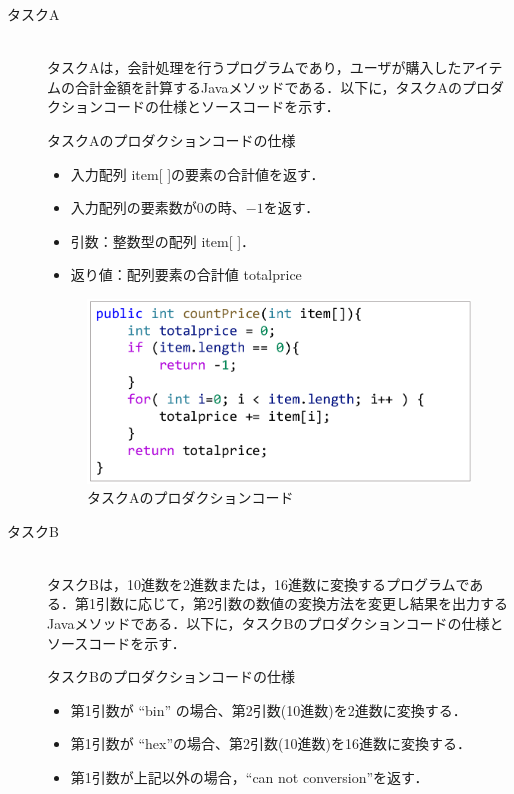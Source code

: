 \documentclass[12pt]{jarticle} %
\begin{document}
\begin{description}
\item[タスクA]~\\
タスクAは，会計処理を行うプログラムであり，ユーザが購入したアイテムの合計金額を計算するJavaメソッドである．以下に，タスクAのプロダクションコードの仕様とソースコードを示す．
\begin{itembox}[l]{タスクAのプロダクションコードの仕様}
\begin{itemize}
\item 入力配列 item[ ]の要素の合計値を返す．
\item 入力配列の要素数が0の時、$-1$を返す．
\item 引数：整数型の配列 item[ ]．
\item 返り値：配列要素の合計値 totalprice
\end{itemize}
\end{itembox}

\begin{figure}[htbp]
  \begin{center}
    \includegraphics[clip,width=12cm]{taskA.pdf}
    \caption{タスクAのプロダクションコード}
    \label{E1}
  \end{center}
\end{figure}

\item[タスクB]~\\
タスクBは，10進数を2進数または，16進数に変換するプログラムである．第1引数に応じて，第2引数の数値の変換方法を変更し結果を出力するJavaメソッドである．以下に，タスクBのプロダクションコードの仕様とソースコードを示す．


\begin{itembox}[l]{タスクBのプロダクションコードの仕様}
\begin{itemize}
\item 第1引数が ``bin'' の場合、第2引数(10進数)を2進数に変換する．
\item 第1引数が ``hex''の場合、第2引数(10進数)を16進数に変換する．
\item 第1引数が上記以外の場合，``can not conversion''を返す．
\end{itemize}
\end{itembox}


\end{description}
\end{document}
